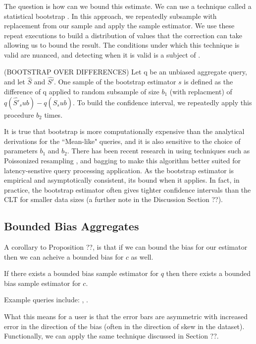 The question is how can we bound this estimate.
We can use a technique called a statistical bootstrap \cite{AgarwalMPMMS13}.
In this approach, we repeatedly subsample with replacement from our sample and apply the sample estimator.
We use these repeat executions to build a distribution of values that the correction can take allowing us to bound the result.
The conditions under which this technique is valid are nuanced, and detecting when it is valid is a subject of \cite{agarwalknowing}.

\begin{proposition} (BOOTSTRAP OVER DIFFERENCES) Let q be an unbiased aggregate query, and let $\hat{S}$ and $\hat{S'}$.
One sample of the bootstrap estimator $s$ is defined as the difference of q applied to random subsample of size $b_1$ (with replacment) of $q(\hat{S'}_sub) - q(\hat{S}_sub)$.
To build the confidence interval, we repeatedly apply this procedure $b_2$ times.
\end{proposition}

It is true that bootstrap is more computationally expensive than the analytical derivations for the ``Mean-like" queries, and it is also sensitive to the choice of parameters $b_1$ and $b_2$.
There has been recent research in using techniques such as Poissonized resampling \cite{agarwalknowing}, and bagging \cite{DBLP:conf/kdd/KleinerTASJ13} to make this algorithm better suited for latency-senstive query processing application.
As the bootstrap estimator is empirical and asymptotically consistent, its bound when it applies. 
In fact, in practice, the bootstrap estimator often gives tighter confidence intervals than the CLT for smaller data sizes (a further note in the Discussion Section ??).

\subsection{Bounded Bias Aggregates}
A corollary to Proposition ??, is that if we can bound the bias for our estimator then we can acheive a bounded bias for $c$ as well.
\begin{corollary}
If there exists a bounded bias sample estimator for $q$ then there exists a bounded bias sample estimator for $c$.
\end{corollary}
Example queries include: \medfunc, \percfunc.

What this means for a user is that the error bars are asymmetric with increased error in the direction of the bias (often in the direction of skew in the dataset).
Functionally, we can apply the same technique discussed in Section ??. 

